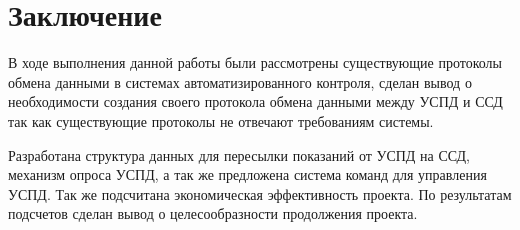 \newpage
\section{Заключение}
\setcounter{figure}{0}

В ходе выполнения данной работы были рассмотрены существующие протоколы обмена данными в системах автоматизированного контроля, сделан вывод о необходимости создания своего протокола обмена данными между УСПД и ССД так как существующие протоколы не отвечают требованиям системы. 

Разработана структура данных для пересылки показаний от УСПД на ССД, механизм опроса УСПД, а так же предложена система команд для управления УСПД.
Так же подсчитана экономическая эффективность проекта. По результатам подсчетов сделан вывод о целесообразности продолжения проекта.